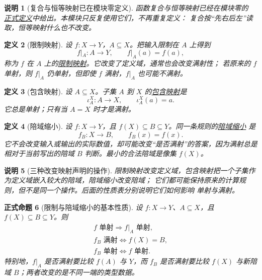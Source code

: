 \documentclass[UTF8,fontset=none,a4paper,11pt]{ctexart}
\theoremstyle{foundation-definition}
\newtheorem{definition}{定义}[section]
\theoremstyle{foundation-theorem}
\theoremstyle{foundation-proposition}
\newtheorem{proposition}[definition]{正式命题}
\theoremstyle{foundation-example}
\theoremstyle{foundation-remark}
\newtheorem{remark}[definition]{说明}
\theoremstyle{foundation-theorem}
\newcommand{\term}[2]{\hyperref[#1]{#2}}
\begin{document}
\begin{remark}[复合与恒等映射已在模块零定义]\label{rem:function-composition-recall}
函数复合与恒等映射已经在模块零的
\term{def:function-composition}{正式定义}中给出。本模块只反复使用它们，不再重复定义：
复合按“先右后左”读取，恒等映射什么也不改变。
\end{remark}

\begin{definition}[限制映射]\label{def:restriction-map}
设 \(f:X\to Y\)，\(A\subseteq X\)。把输入限制在 \(A\) 上得到
\[
f|_A:A\to Y,\qquad f|_A(a)=f(a),
\]
称为 \(f\) 在 \(A\) 上的\term{def:restriction-map}{限制映射}。它改变了定义域，通常也会改变满射性；
若原来的 \(f\) 单射，则 \(f|_A\) 仍单射，但即使 \(f\) 满射，\(f|_A\) 也可能不满射。
\end{definition}

\begin{definition}[包含映射]\label{def:inclusion-map}
设 \(A\subseteq X\)。子集 \(A\) 到 \(X\) 的\term{def:inclusion-map}{包含映射}是
\[
\iota_A^X:A\to X,\qquad \iota_A^X(a)=a.
\]
它总是单射；只有当 \(A=X\) 时才是满射。
\end{definition}

\begin{definition}[陪域缩小]\label{def:codomain-restriction}
设 \(f:X\to Y\)，且 \(f(X)\subseteq B\subseteq Y\)。同一条规则的\term{def:codomain-restriction}{陪域缩小}
是
\[
f_B:X\to B,\qquad f_B(x)=f(x).
\]
它不会改变输入或输出的实际数值，却可能改变“是否满射”的答案，因为满射总是
相对于当前写出的陪域 \(B\) 判断。最小的合法陪域是像集 \(f(X)\)。
\end{definition}

\begin{remark}[三种改变映射声明的操作]
限制映射改变定义域，包含映射把一个子集作为定义域嵌入较大的陪域，陪域缩小改变陪域；
它们都可能保持原来的计算规则，但不是同一个操作。后面的性质表分别说明它们如何影响
单射与满射。
\end{remark}

\begin{proposition}[限制与陪域缩小的基本性质]
设 \(f:X\to Y\)、\(A\subseteq X\)，且 \(f(X)\subseteq B\subseteq Y\)。则
\[
\begin{array}{c}
f\text{ 单射}\Longrightarrow f|_A\text{ 单射},\\[0.2em]
f_B\text{ 满射}\Longleftrightarrow f(X)=B,\\[0.2em]
f_B\text{ 单射}\Longleftrightarrow f\text{ 单射}.
\end{array}
\]
特别地，\(f|_A\) 是否满射要比较 \(f(A)\) 与 \(Y\)，而 \(f_B\) 是否满射要比较
\(f(X)\) 与新陪域 \(B\)；两者改变的是不同一端的类型数据。
\end{proposition}
\end{document}
